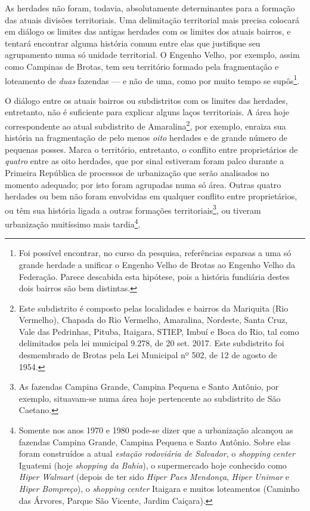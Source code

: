As herdades não foram, todavia, absolutamente determinantes para a formação das atuais divisões territoriais. Uma delimitação territorial mais precisa colocará em diálogo os limites das antigas herdades com os limites dos atuais bairros, e tentará encontrar alguma história comum entre elas que justifique seu agrupamento numa só unidade territorial. O Engenho Velho, por exemplo, assim como Campinas de Brotas, tem seu território formado pela fragmentação e loteamento de \textit{duas} fazendas --- e não de uma, como por muito tempo se supôs\footnote{Foi possível encontrar, no curso da pesquisa, referências esparsas a uma só grande herdade a unificar o Engenho Velho de Brotas ao Engenho Velho da Federação. Parece descabida esta hipótese, pois a história fundiária destes dois bairros são bem distintas.}. 

O diálogo entre os atuais bairros ou subdistritos com os limites das herdades, entretanto, não é suficiente para explicar alguns laços territoriais. A área hoje correspondente ao atual subdistrito de Amaralina\footnote{Este subdistrito é composto pelas localidades e bairros da Mariquita (Rio Vermelho), Chapada do Rio Vermelho, Amaralina, Nordeste, Santa Cruz, Vale das Pedrinhas, Pituba, Itaigara, STIEP, Imbuí e Boca do Rio, tal como delimitados pela lei municipal 9.278, de 20 set. 2017. Este subdistrito foi desmembrado de Brotas pela Lei Municipal nº 502, de 12 de agosto de 1954.}, por exemplo, enraiza sua história na fragmentação de pelo menos \textit{oito} herdades e de grande número de pequenas posses. Marca o território, entretanto, o conflito entre proprietários de \textit{quatro} entre as oito herdades, que por sinal estiveram foram palco durante a Primeira República de processos de urbanização que serão analisados no momento adequado; por isto foram agrupadas numa só área. Outras quatro herdades ou bem não foram envolvidas em qualquer conflito entre proprietários, ou têm sua história ligada a outras formações territoriais\footnote{As fazendas Campina Grande, Campina Pequena e Santo Antônio, por exemplo, situavam-se numa área hoje pertencente ao subdistrito de São Caetano.}, ou tiveram urbanização muitíssimo mais tardia\footnote{Somente nos anos 1970 e 1980 pode-se dizer que a urbanização alcançou as fazendas Campina Grande, Campina Pequena e Santo Antônio. Sobre elas foram construídos a atual \textit{estação rodoviária de Salvador}, o \textit{shopping center} Iguatemi (hoje \textit{shopping da Bahia}), o supermercado hoje conhecido como \textit{Hiper Walmart} (depois de ter sido \textit{Hiper Paes Mendonça}, \textit{Hiper Unimar} e \textit{Hiper Bompreço}), o \textit{shopping center} Itaigara e muitos loteamentos (Caminho das Árvores, Parque São Vicente, Jardim Caiçara).}.

